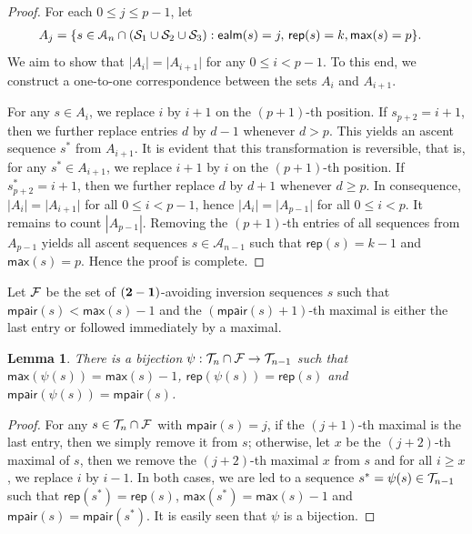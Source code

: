 \documentclass[12pt]{amsart}
\newcounter{mycount}
\theoremstyle{plain}
\newtheorem{lemma}[mycount]{Lemma}
\theoremstyle{definition}
\theoremstyle{example}
\theoremstyle{remark}
\numberwithin{equation}{section}
\numberwithin{figure}{section}
\def\max{\mathsf{max}}
\def\rep{\mathsf{rep}}
\def\ealm{\mathsf{ealm}}
\def\mpair{\mathsf{mpair}}
\def\A{\mathcal{A}}
\def\T{\CMcal{T}}
\def\CS{ \CMcal{S}}
\begin{document}
\begin{proof}

For each $0\le j\le p-1$, let
\begin{align*}
A_{j}&=\{s\in \A_n\cap(\CS_1\cup\CS_2\cup\CS_3): \ealm(s)=j, \,\rep(s)=k,\max(s)=p\}.
\end{align*}
We aim to show that $\vert A_{i}\vert=\vert A_{i+1}\vert$ for any $0\le i<p-1$. To this end, we construct a one-to-one correspondence between the sets $A_i$ and $A_{i+1}$.

For any $s\in A_i$, we replace $i$ by $i+1$ on the $(p+1)$-th position. If $s_{p+2}=i+1$, then we further replace entries $d$ by $d-1$ whenever $d>p$. This yields an ascent sequence $s^*$ from $A_{i+1}$. It is evident that this transformation is reversible, that is, for any $s^*\in A_{i+1}$, we replace $i+1$ by $i$ on the $(p+1)$-th position. If $s^*_{p+2}=i+1$, then we further replace $d$ by $d+1$ whenever $d\ge p$.
In consequence, $\vert A_i\vert=\vert A_{i+1}\vert$ for all $0\le i<p-1$, hence $\vert A_i\vert=\vert A_{p-1}\vert$ for all $0\le i<p$. It remains to count $|A_{p-1}|$. Removing the $(p+1)$-th entries of all sequences from $A_{p-1}$ yields all ascent sequences $s\in\A_{n-1}$ such that $\rep(s)=k-1$ and $\max(s)=p$. Hence the proof is complete.
\end{proof}


 Let $\CMcal{F}$ be the set of $({\bf2-1})$-avoiding inversion sequences $s$  such that $\mpair(s)<\max(s)-1$ and the $(\mathsf{mpair}(s)+1)$-th maximal is either the last entry or followed immediately by a maximal. 

\begin{lemma}\label{L:d4}
There is a bijection $\psi: \CMcal{T}_{n}\cap \CMcal{F}\rightarrow\CMcal{T}_{n-1}$ such that $\max(\psi(s))=\mathsf{max}(s)-1$, $\rep(\psi(s))=\rep(s)$ and $\mpair(\psi(s))=\mpair(s)$.

\end{lemma}
\begin{proof}
For any $s\in \CMcal{T}_n\cap \CMcal{F}$ with $\mathsf{mpair}(s)=j$, if the $(j+1)$-th maximal is the last entry, then we simply remove it from $s$; otherwise, let $x$ be the $(j+2)$-th maximal of $s$, then we remove the $(j+2)$-th maximal $x$ from $s$ and for all $i\ge x$, we replace $i$ by $i-1$. In both cases, we are led to a  sequence $s^*=\psi(s)\in\T_{n-1}$ such that $\mathsf{rep}(s^*)=\mathsf{rep}(s)$, $\mathsf{max}(s^*)=\mathsf{max}(s)-1$ and $\mathsf{mpair}(s)=\mathsf{mpair}(s^*)$. It is easily seen that $\psi$ is a bijection.
\end{proof}
\end{document}
